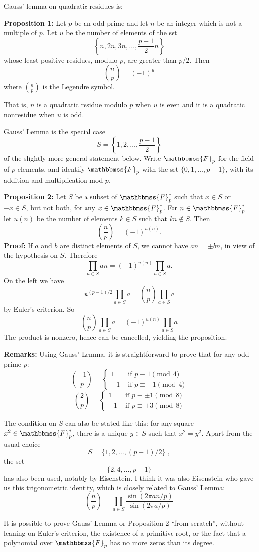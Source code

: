 \documentclass{article}
\newcommand{\F}{\mathbbmss{F}}
\newcommand{\legsymp}[1]{\left(\frac{#1}{p}\right)}
\begin{document}

Gauss' lemma on quadratic residues is:

\textbf{Proposition 1:} Let $p$ be an odd prime and let $n$
be an integer which is not a multiple of $p$. Let $u$ be the
number of elements of the set
$$\left\{n,2n,3n,\ldots,\frac{p-1}{2}n\right\}$$
whose least positive residues, modulo $p$, are greater than $p/2$.
Then $$\legsymp{n}=(-1)^u$$
where $\legsymp{n}$ is the Legendre symbol.

That is, $n$ is a quadratic residue modulo
$p$ when $u$ is even and it is a quadratic nonresidue when $u$ is odd.

Gauss' Lemma is the special case
\[S=\left\{1,2,\ldots,\frac{p-1}{2}\right\}\]
of the slightly more general statement below.
Write $\F_p$ for the field of $p$ elements, and
identify $\F_p$ with the set $\{0,1,\ldots,p-1\}$,
with its addition and multiplication mod $p$.

\textbf{Proposition 2:} Let $S$ be a subset of $\F_p^{*}$ such that
$x\in S$ or $-x\in S$, but not both, for any $x\in \F_p^{*}$.
For $n\in \F_p^{*}$ let $u(n)$
be the number of elements $k\in S$ such that $kn\notin S$. Then
$$\legsymp{n} = (-1)^{u(n)}.$$
\textbf{Proof:} If $a$ and $b$ are distinct elements of $S$, we cannot have
$an=\pm bn$, in view of the hypothesis on $S$. Therefore
$$\prod_{a\in S}an=(-1)^{u(n)}\prod_{a\in S}a.$$
On the left we have
$$n^{(p-1)/2}\prod_{a\in S}a=\legsymp{n}\prod_{a\in S}a$$
by Euler's criterion. So
$$\legsymp{n}\prod_{a\in S}a=(-1)^{u(n)}\prod_{a\in S}a$$
The product is nonzero, hence can be cancelled, yielding the proposition.

\textbf{Remarks:} Using Gauss' Lemma, it is straightforward to prove that
for any odd prime $p$:
\[
\legsymp{-1}=
\begin{cases}
1 & \textrm{ if $p\equiv 1\pmod 4$} \\
-1 & \textrm{ if $p\equiv -1\pmod 4$}
\end{cases}
\]
\[
\legsymp{2}=
\begin{cases}
1 & \textrm{ if $p\equiv \pm 1\pmod 8$} \\
-1 & \textrm{ if $p\equiv \pm 3\pmod 8$}
\end{cases}
\]

The condition on $S$ can also be stated like this:
for any square $x^2\in \F_p^{*}$, there is a unique $y\in S$ such
that $x^2=y^2$. Apart from the usual choice
$$S=\{1,2,\ldots,(p-1)/2\}\;,$$
the set
$$\{2,4,\ldots,p-1\}$$ has also been used, notably by Eisenstein.
I think it was also Eisenstein who gave us this trigonometric identity,
which is closely related to Gauss' Lemma:
$$\legsymp{n}=\prod_{a\in S}\frac{\sin{(2\pi an/p)}}{\sin{(2\pi a/p)}}$$

It is possible to prove Gauss' Lemma or Proposition 2 ``from scratch'', without
leaning on Euler's criterion, the existence of a primitive
root, or the fact that a polynomial over $\F_p$ has no more zeros
than its degree.
\end{document}
